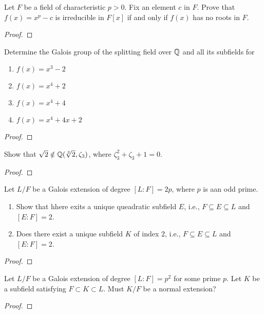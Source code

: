 \begin{problem}
Let $F$ be a field of characteristic $p>0$. Fix an element $c$ in
$F$. Prove that $f(x)=x^p-c$ is irreducible in $F[x]$ if and only if $f(x)$
has no roots in $F$.
\end{problem}
\begin{proof}
\end{proof}

\begin{problem}
Determine the Galois group of the splitting field over $\mathbb{Q}$ and all its
subfields for
\begin{enumerate}[label=(\alph*)]
\item $f(x)=x^3-2$
\item $f(x)=x^4+2$
\item $f(x)=x^4+4$
\item $f(x)=x^4+4x+2$
\end{enumerate}
\end{problem}
\begin{proof}
\end{proof}

\begin{problem}
Show that $\sqrt{2}\notin\mathbb{Q}(\sqrt[3]{2},\zeta_3)$, where
$\zeta_3^2+\zeta_3+1=0$.
\end{problem}
\begin{proof}
\end{proof}

\begin{problem}
Let $L/F$ be a Galois extension of degree $[L:F]=2p$, where $p$ is aan odd
prime.
\begin{enumerate}[label=(\alph*)]
\item Show that hhere exits a unique queadratic subfield $E$, i.e.,
  $F\subseteq E\subseteq L$ and $[E:F]=2$.
\item Does there exist a unique subfield $K$ of index $2$, i.e.,
  $F\subseteq E\subseteq L$ and $[E:F]=2$.
\end{enumerate}
\end{problem}
\begin{proof}
\end{proof}

\begin{problem}
Let $L/F$ be a Galois extension of degree $[L:F]=p^2$ for some prime
$p$. Let $K$ be a subfield satisfying $F\subset K\subset L$. Must $K/F$ be
a normal extension?
\end{problem}
\begin{proof}
\end{proof}

